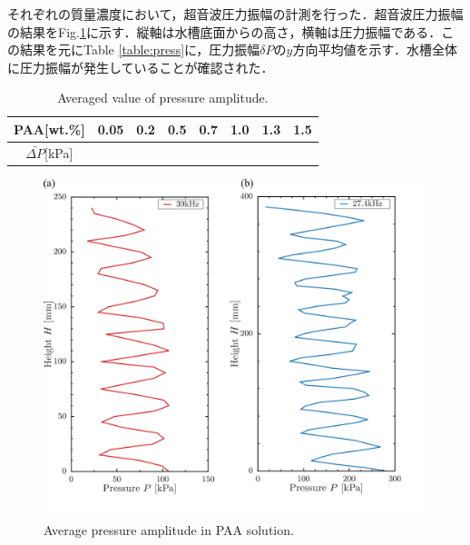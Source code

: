 それぞれの質量濃度において，超音波圧力振幅の計測を行った．超音波圧力振幅の結果をFig.\ref{fig:pressure}に示す．縦軸は水槽底面からの高さ，横軸は圧力振幅である．この結果を元にTable \ref{table:press}に，圧力振幅$\delta{}P$の$y$方向平均値を示す．水槽全体に圧力振幅が発生していることが確認された．

\begin{table}[h]
	\centering
	\caption{Averaged value of pressure amplitude.}
	\label{table:press-A}
	\begin{tabular}{c|c|c|c|c|c|c|c} \hline
		PAA[wt.\%]             & 0.05 & 0.2 & 0.5 & 0.7 & 1.0 & 1.3 & 1.5 \\ \hline \hline
		$\bar{\Delta{}P}$[kPa] &      &     &     &     &     &     &     \\ \hline
	\end{tabular}
\end{table}

\begin{figure}[ht]
	\centering
	\includegraphics[width=12cm,clip]{4-Results/press.png}
	\caption{Average pressure amplitude in PAA solution.}
	\label{fig:pressure}
\end{figure}
